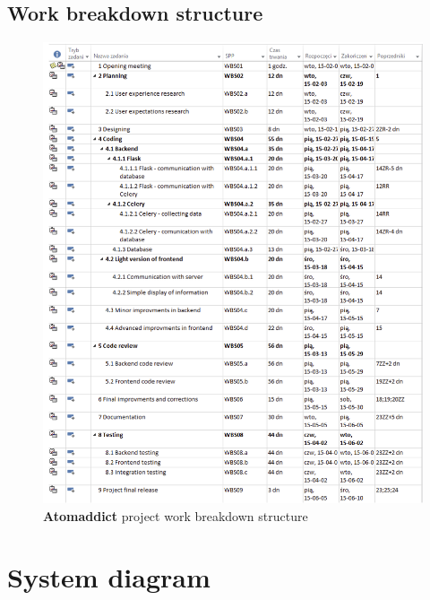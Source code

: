 \documentclass[12pt]{article}
\begin{document}
\subsection{Work breakdown structure}

\begin{figure}[H]
    \centering
    \includegraphics[width=\textwidth]{images/breakdown.png}
    \caption{\textbf{Atomaddict} project work breakdown structure}
\end{figure}



\section{System diagram}
\end{document}
